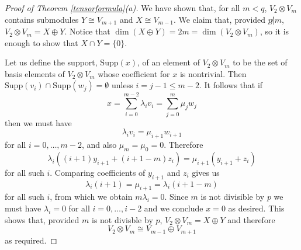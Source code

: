 \documentclass[a4paper]{amsart}
\theoremstyle{definition}
\theoremstyle{remark}
\theoremstyle{Acknowledgments}
\begin{document}
\begin{proof}[Proof of Theorem \ref{tensorformula}(a)] We have shown that, for all $m<q$, $V_2 \otimes V_m$ contains submodules $Y \cong V_{m+1}$ and $X \cong V_{m-1}$. We claim that, provided $p \not | m$, $V_2 \otimes V_m = X \oplus Y$. Notice that $\dim(X \oplus Y) = 2m =  \dim(V_2 \otimes V_m)$, so it is enough to show that $X \cap Y = \{0\}$.

Let us define the support, $\mathrm{Supp}(x)$, of an element of $V_2 \otimes V_m$ to be the set of basis elements of $V_2 \otimes V_m$ whose coefficient for $x$ is nontrivial. Then $\mathrm{Supp}(v_i) \cap \mathrm{Supp}(w_j) = \emptyset$ unless $i=j-1 \leq m-2$. It follows that if
\[x = \sum_{i=0}^{m-2} \lambda_i v_i = \sum_{j=0}^m \mu_j w_j\] then we must have 
\[\lambda_i v_i = \mu_{i+1} w_{i+1}\] for all $i = 0, \ldots, m-2$, and also $\mu_m = \mu_0 = 0$. Therefore
\[\lambda_i( (i+1)y_{i+1} + (i+1-m)z_i) = \mu_{i+1}(y_{i+1} + z_i)\] for all such $i$.
Comparing coefficients of $y_{i+1}$ and $z_i$ gives us
\[\lambda_i(i+1) = \mu_{i+1} = \lambda_i(i+1-m)\]
for all such $i$, from which we obtain $m \lambda_i = 0$. Since $m$ is not divisible by $p$ we must have $\lambda_i = 0$ for all $i=0, \ldots, i-2$ and we conclude $x=0$ as desired. This shows that, provided $m$ is not divisble by $p$,  $V_2 \otimes V_m = X \oplus Y$ and therefore 
\[V_2 \otimes V_m \cong  V_{m-1} \oplus V_{m+1}\] as required.
\end{proof}
\end{document}

